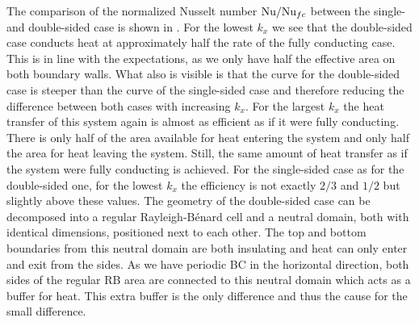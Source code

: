 The comparison of the normalized Nusselt number $\text{Nu}/\text{Nu}_{fc}$ between the
single- and double-sided case is shown in .  For the
lowest $k_x$ we see that the double-sided case conducts heat at approximately
half the rate of the fully conducting case.  This is in line with the
expectations, as we only have half the effective area on both boundary walls.
What also is visible is that the curve for the double-sided case is steeper
than the curve of the single-sided case and therefore reducing the difference
between both cases with increasing $k_x$.  For the largest $k_x$ the heat
transfer of this system again is almost as efficient as if it were fully
conducting.  There is only half of the area available for heat entering the
system and only half the area for heat leaving the system.  Still, the same
amount of heat transfer as if the system were fully conducting is achieved.
For the single-sided case as for the double-sided one, for the lowest $k_x$
the efficiency is not exactly $2/3$ and $1/2$ but slightly above these values.
The geometry of the double-sided case can be decomposed into a regular
Rayleigh-B\'enard cell and a neutral domain, both with identical dimensions,
positioned next to each other.  The top and bottom boundaries from this
neutral domain are both insulating and heat can only enter and exit from the
sides.  As we have periodic BC in the horizontal direction, both sides of the
regular RB area are connected to this neutral domain which acts as a buffer
for heat.  This extra buffer is the only difference and thus the cause for the
small difference.

